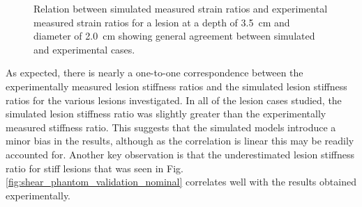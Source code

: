 			\begin{figure}[!htb]
				\centering
				\caption[Experimental validation of shear wave speed quantification model results]{Relation between simulated measured strain ratios and experimental measured strain ratios for a lesion at a depth of \SI{3.5}{\cm} and diameter of \SI{2.0}{\cm} showing general agreement between simulated and experimental cases.}
				\label{fig:shear_phantom_validation}
			\end{figure}

			As expected, there is nearly a one-to-one correspondence between the experimentally measured lesion stiffness ratios and the simulated lesion stiffness ratios for the various lesions investigated. In all of the lesion cases studied, the simulated lesion stiffness ratio was slightly greater than the experimentally measured stiffness ratio. This suggests that the simulated models introduce a minor bias in the results, although as the correlation is linear this may be readily accounted for. Another key observation is that the underestimated lesion stiffness ratio for stiff lesions that was seen in Fig. \ref{fig:shear_phantom_validation_nominal} correlates well with the results obtained experimentally.

